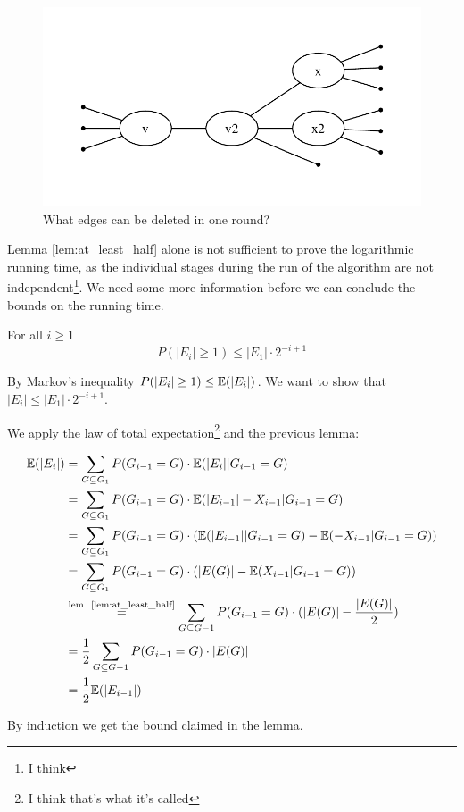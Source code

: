 \begin{pr}
\begin{figure}
\begin{center}
\includegraphics{./images/randomized_matching_delete_edge}
\end{center}
\caption{What edges can be deleted in one round?}
\label{fig:at_least_half}
\end{figure}
\end{pr}

Lemma \ref{lem:at_least_half} alone is not sufficient to prove the logarithmic running time, as the individual stages during the run of the algorithm are not independent\footnote{I think}. We need some more information before we can conclude the bounds on the running time.

\begin{lem} For all $i\geq 1$
\[P(|E_i| \geq 1) \leq |E_1| \cdot 2^{-i+1}\]
\end{lem}

\begin{pr} By Markov's inequality $P(|E_i| \geq 1) \leq \mathbb{E}(|E_i|)$. We want to show that $|E_i|\leq |E_1|\cdot 2^{-i+1}$.

We apply the law of total expectation\footnote{I think that's what it's called} and the previous lemma:

\begin{align*}
\mathbb{E}(|E_i|) &= \sum_{G\subseteq G_1} P(G_{i-1} =G) \cdot \mathbb{E}(|E_i| | G_{i-1}=G)\\
	&=\sum_{G\subseteq G_1}  P(G_{i-1} =G) \cdot \mathbb{E}(|E_{i-1}| -X_{i-1} | G_{i-1}=G)\\
	&=\sum_{G\subseteq G_1}  P(G_{i-1} =G) \cdot (\mathbb{E}(|E_{i-1}| | G_{i-1}=G) - \mathbb{E}( -X_{i-1} | G_{i-1}=G))\\
	&=\sum_{G\subseteq G_1}  P(G_{i-1} =G) \cdot (|E(G)| - \mathbb{E}(X_{i-1} | G_{i-1}=G))\\
	&\stackrel{\text{lem. \ref{lem:at_least_half}}}{=} \sum_{G\subseteq G-1}  P(G_{i-1} =G) \cdot (|E(G)| - \frac{|E(G)|}{2})\\
	&=\frac 12 \sum_{G\subseteq G-1}  P(G_{i-1} =G) \cdot |E(G)|\\
	&=\frac 12 \mathbb{E}(|E_{i-1}|)\\
\end{align*}

By induction we get the bound claimed in the lemma.
\end{pr}

